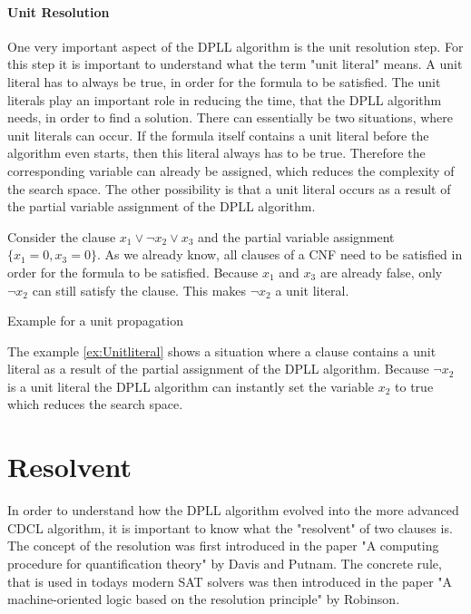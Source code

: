 \paragraph{Unit Resolution}
One very important aspect of the DPLL algorithm is the unit resolution step. For this step it is important to understand what the term "unit literal" means. A unit literal has to always be true, in order for the formula to be satisfied. The unit literals play an important role in reducing the time, that the DPLL algorithm needs, in order to find a solution. There can essentially be two situations, where unit literals can occur. If the formula itself contains a unit literal before the algorithm even starts, then this literal always has to be true. Therefore the corresponding variable can already be assigned, which reduces the complexity of the search space. The other possibility is that a unit literal occurs as a result of the partial variable assignment of the DPLL algorithm.

\begin{example}
\begin{leftbar}
Consider the clause $x_1 \vee \neg x_2 \vee x_3$ and the partial variable assignment $\{x_1=0,x_3=0\}$. As we already know, all clauses of a CNF need to be satisfied in order for the formula to be satisfied. Because $x_1$ and $x_3$ are already false, only $\neg x_2$ can still satisfy the clause. This makes $\neg x_2$ a unit literal.
\end{leftbar}
\caption{Example for a unit propagation}
\label{ex:Unitliteral}
\end{example}

The example \ref{ex:Unitliteral} shows a situation where a clause contains a unit literal as a result of the partial assignment of the DPLL algorithm. Because $\neg x_2$ is a unit literal the DPLL algorithm can instantly set the variable $x_2$ to true which reduces the search space.

\section{Resolvent}
In order to understand how the DPLL algorithm evolved into the more advanced CDCL algorithm, it is important to know what the "resolvent" of two clauses is. The concept of the resolution was first introduced in the paper "A computing procedure for quantification theory" \cite{davis1960computing} by Davis and Putnam. The concrete rule, that is used in todays modern SAT solvers was then introduced in the paper "A machine-oriented logic based on the resolution principle" \cite{robinson1965machine} by Robinson.

